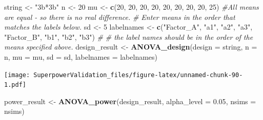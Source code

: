 \documentclass[]{book}
\newenvironment{Shaded}{\begin{snugshade}}{\end{snugshade}}
\newcommand{\CommentTok}[1]{\textcolor[rgb]{0.56,0.35,0.01}{\textit{#1}}}
\newcommand{\DataTypeTok}[1]{\textcolor[rgb]{0.13,0.29,0.53}{#1}}
\newcommand{\DecValTok}[1]{\textcolor[rgb]{0.00,0.00,0.81}{#1}}
\newcommand{\FloatTok}[1]{\textcolor[rgb]{0.00,0.00,0.81}{#1}}
\newcommand{\KeywordTok}[1]{\textcolor[rgb]{0.13,0.29,0.53}{\textbf{#1}}}
\newcommand{\NormalTok}[1]{#1}
\newcommand{\StringTok}[1]{\textcolor[rgb]{0.31,0.60,0.02}{#1}}
\begin{document}
\begin{Shaded}
\begin{Highlighting}[]
\NormalTok{string <-}\StringTok{ "3b*3b"}
\NormalTok{n <-}\StringTok{ }\DecValTok{20}
\NormalTok{mu <-}\StringTok{ }\KeywordTok{c}\NormalTok{(}\DecValTok{20}\NormalTok{, }\DecValTok{20}\NormalTok{, }\DecValTok{20}\NormalTok{, }\DecValTok{20}\NormalTok{, }\DecValTok{20}\NormalTok{, }\DecValTok{20}\NormalTok{, }\DecValTok{20}\NormalTok{, }\DecValTok{20}\NormalTok{, }\DecValTok{25}\NormalTok{) }\CommentTok{#All means are equal - so there is no real difference.}
\CommentTok{# Enter means in the order that matches the labels below.}
\NormalTok{sd <-}\StringTok{ }\DecValTok{5}
\NormalTok{labelnames <-}\StringTok{ }\KeywordTok{c}\NormalTok{(}\StringTok{"Factor_A"}\NormalTok{, }\StringTok{"a1"}\NormalTok{, }\StringTok{"a2"}\NormalTok{, }\StringTok{"a3"}\NormalTok{, }\StringTok{"Factor_B"}\NormalTok{, }\StringTok{"b1"}\NormalTok{, }\StringTok{"b2"}\NormalTok{, }\StringTok{"b3"}\NormalTok{) }\CommentTok{#}
\CommentTok{# the label names should be in the order of the means specified above.}
\NormalTok{design_result <-}\StringTok{ }\KeywordTok{ANOVA_design}\NormalTok{(}\DataTypeTok{design =}\NormalTok{ string,}
                   \DataTypeTok{n =}\NormalTok{ n, }
                   \DataTypeTok{mu =}\NormalTok{ mu, }
                   \DataTypeTok{sd =}\NormalTok{ sd, }
                   \DataTypeTok{labelnames =}\NormalTok{ labelnames)}
\end{Highlighting}
\end{Shaded}

\texttt{[image: SuperpowerValidation\_files/figure-latex/unnamed-chunk-90-1.pdf]}

\begin{Shaded}
\begin{Highlighting}[]
\NormalTok{power_result <-}\StringTok{ }\KeywordTok{ANOVA_power}\NormalTok{(design_result, }\DataTypeTok{alpha_level =} \FloatTok{0.05}\NormalTok{, }\DataTypeTok{nsims =}\NormalTok{ nsims)}
\end{Highlighting}
\end{Shaded}
\end{document}

